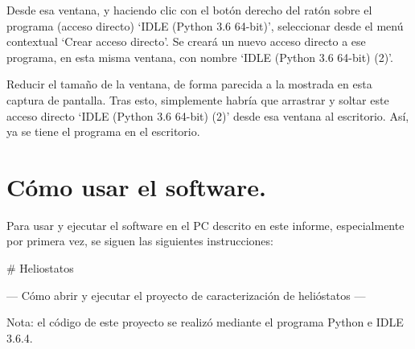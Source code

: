 \documentclass[12pt]{article}
\begin{document}
Desde esa ventana, y haciendo clic con el botón derecho del ratón sobre el programa (acceso directo) ‘IDLE (Python 3.6 64-bit)’, seleccionar desde el menú contextual ‘Crear acceso directo’. Se creará un nuevo acceso directo a ese programa, en esta misma ventana, con nombre ‘IDLE (Python 3.6 64-bit) (2)’.



Reducir el tamaño de la ventana, de forma parecida a la mostrada en esta captura de pantalla. Tras esto, simplemente habría que arrastrar y soltar este acceso directo ‘IDLE (Python 3.6 64-bit) (2)’ desde esa ventana al escritorio. Así, ya se tiene el programa en el escritorio.


\section{Cómo usar el software.}

Para usar y ejecutar el software en el PC descrito en este informe, especialmente por primera vez, se siguen las siguientes instrucciones:

\# Heliostatos

--- Cómo abrir y ejecutar el proyecto de caracterización de helióstatos ---

Nota: el código de este proyecto se realizó mediante el programa Python e IDLE 3.6.4.
\end{document}
